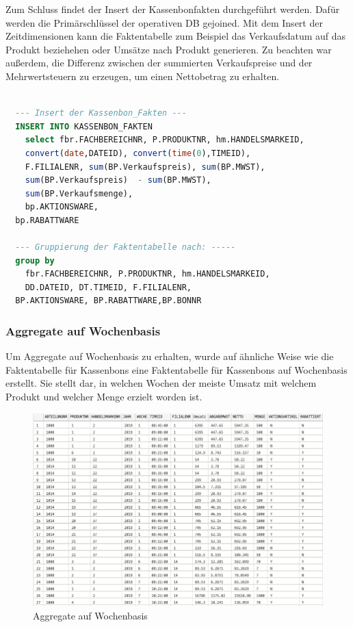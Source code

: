 Zum Schluss findet der Insert der Kassenbonfakten durchgeführt werden. Dafür werden die Primärschlüssel der operativen DB gejoined. Mit dem Insert der Zeitdimensionen kann die Faktentabelle zum Beispiel das Verkaufsdatum auf das Produkt beziehehen oder Umsätze nach Produkt generieren. Zu beachten war außerdem, die Differenz zwischen der summierten Verkaufspreise und der Mehrwertsteuern zu erzeugen, um einen Nettobetrag zu erhalten.

\begin{lstlisting}[language=SQL]

  --- Insert der Kassenbon_Fakten ---
  INSERT INTO KASSENBON_FAKTEN
	select fbr.FACHBEREICHNR, P.PRODUKTNR, hm.HANDELSMARKEID,
	convert(date,DATEID), convert(time(0),TIMEID),
    F.FILIALENR, sum(BP.Verkaufspreis), sum(BP.MWST),
	sum(BP.Verkaufspreis)  - sum(BP.MWST),
	sum(BP.Verkaufsmenge),
	bp.AKTIONSWARE,
  bp.RABATTWARE

  --- Gruppierung der Faktentabelle nach: -----
  group by
	fbr.FACHBEREICHNR, P.PRODUKTNR, hm.HANDELSMARKEID,
	DD.DATEID, DT.TIMEID, F.FILIALENR,
  BP.AKTIONSWARE, BP.RABATTWARE,BP.BONNR

\end{lstlisting}

\subsubsection{Aggregate auf Wochenbasis}

Um Aggregate auf Wochenbasis zu erhalten, wurde auf ähnliche Weise wie die Faktentabelle für Kassenbons eine Faktentabelle für Kassenbons auf Wochenbasis erstellt. Sie stellt dar, in welchen Wochen der meiste Umsatz mit welchem Produkt und welcher Menge erzielt worden ist.

\begin{figure}[ht!]
  \centering
  \includegraphics[width=1.1\linewidth]{pictures/fakten_woche.png}
  \caption{Aggregate auf Wochenbasis}
  \label{fakten_woche}
\end{figure}

